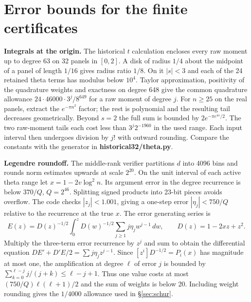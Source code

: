 \documentclass[11pt,a4paper,reqno]{amsart}
\numberwithin{equation}{section}
\begin{document}
\appendix

\section{Error bounds for the finite certificates}\label{sec:errors}


\textbf{Integrals at the origin.} The historical \(t\) calculation encloses every raw moment up to degree 63 on 32 panels in \([0,2]\). A disk of radius \(1/4\) about the midpoint of a panel of length \(1/16\) gives radius ratio \(1/8\). On it \(|s|<3\) and each of the 24 retained theta terms has modulus below \(10^4\). Taylor approximation, positivity of the quadrature weights and exactness on degree 648 give the common quadrature allowance \(24\cdot46000\cdot3^j/8^{649}\) for a raw moment of degree \(j\). For \(n\ge25\) on the real panels, extract the \(e^{-\pi n^2}\) factor; the rest is polynomial and the resulting tail decreases geometrically. Beyond \(s=2\) the full sum is bounded by \(2e^{-\pi e^{4s}/2}\). The two raw-moment tails each cost less than \(3^j 2^{-1960}\) in the used range. Each input interval then undergoes division by \(j!\) with outward rounding. Compare the constants with the generator in \textbf{historical32/theta.py}.

\textbf{Legendre roundoff.} The middle-rank verifier partitions \(d\) into 4096 bins and rounds norm estimates upwards at scale \(2^{20}\). On the unit interval of each active theta range let \(x=1-2v\log^2n\). Its argument error in the degree recurrence is below \(370/Q\), \(Q=2^{46}\). Splitting signed products into 23-bit pieces avoids overflow. The code checks \(|z_j|<1.001\), giving a one-step error \(|\eta_j|<750/Q\) relative to the recurrence at the true \(x\). The error generating series is \[E(z)=D(z)^{-1/2}\int_0^z D(w)^{-1/2}\sum_{j\ge1}j\eta_jw^{j-1}\,dw,\qquad D(z)=1-2xz+z^2.\] Multiply the three-term error recurrence by \(z^j\) and sum to obtain the differential equation \(DE'+D'E/2=\sum j\eta_j z^{j-1}\). Since \([z^i]D^{-1/2}=P_i(x)\) has magnitude at most one, the amplification at degree \(\ell\) of error \(j\) is bounded by \(\sum_{k=0}^{\ell-j}j/(j+k)\le\ell-j+1\). Thus one value costs at most \((750/Q)\ell(\ell+1)/2\) and the sum of weights is below 20. Including weight rounding gives the \(1/4000\) allowance used in \S\ref{sec:schur}.
\end{document}
